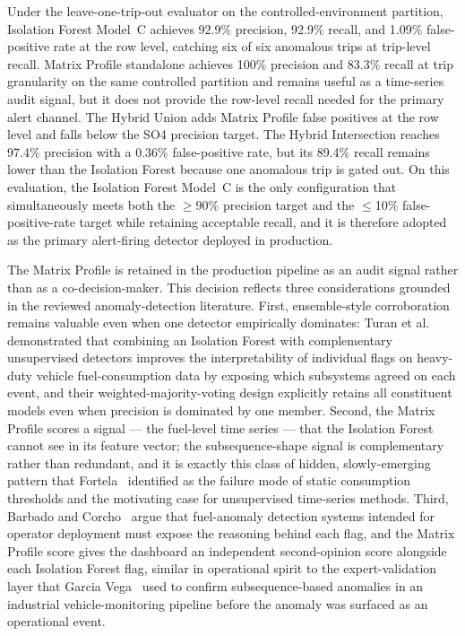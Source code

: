 Under the leave-one-trip-out evaluator on the controlled-environment partition, Isolation Forest Model~C achieves 92.9\% precision, 92.9\% recall, and 1.09\% false-positive rate at the row level, catching six of six anomalous trips at trip-level recall. Matrix Profile standalone achieves 100\% precision and 83.3\% recall at trip granularity on the same controlled partition and remains useful as a time-series audit signal, but it does not provide the row-level recall needed for the primary alert channel. The Hybrid Union adds Matrix Profile false positives at the row level and falls below the SO4 precision target. The Hybrid Intersection reaches 97.4\% precision with a 0.36\% false-positive rate, but its 89.4\% recall remains lower than the Isolation Forest because one anomalous trip is gated out. On this evaluation, the Isolation Forest Model~C is the only configuration that simultaneously meets both the $\geq$90\% precision target and the $\leq$10\% false-positive-rate target while retaining acceptable recall, and it is therefore adopted as the primary alert-firing detector deployed in production.

The Matrix Profile is retained in the production pipeline as an audit signal rather than as a co-decision-maker. This decision reflects three considerations grounded in the reviewed anomaly-detection literature. First, ensemble-style corroboration remains valuable even when one detector empirically dominates: Turan et al.~\cite{turan2024detecting} demonstrated that combining an Isolation Forest with complementary unsupervised detectors improves the interpretability of individual flags on heavy-duty vehicle fuel-consumption data by exposing which subsystems agreed on each event, and their weighted-majority-voting design explicitly retains all constituent models even when precision is dominated by one member. Second, the Matrix Profile scores a signal --- the fuel-level time series --- that the Isolation Forest cannot see in its feature vector; the subsequence-shape signal is complementary rather than redundant, and it is exactly this class of hidden, slowly-emerging pattern that Fortela~\cite{fortela2023unsupervised} identified as the failure mode of static consumption thresholds and the motivating case for unsupervised time-series methods. Third, Barbado and Corcho~\cite{barbado2022interpretable} argue that fuel-anomaly detection systems intended for operator deployment must expose the reasoning behind each flag, and the Matrix Profile score gives the dashboard an independent second-opinion score alongside each Isolation Forest flag, similar in operational spirit to the expert-validation layer that Garcia Vega~\cite{garcia2022development} used to confirm subsequence-based anomalies in an industrial vehicle-monitoring pipeline before the anomaly was surfaced as an operational event.

